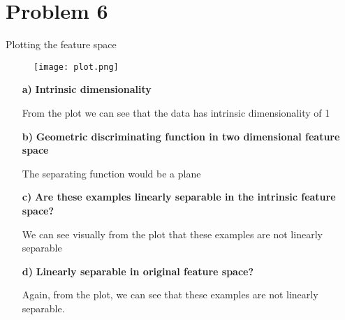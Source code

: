 \section{Problem 6}%

Plotting the feature space

\graphicspath{ {/home/computer/ucsc/master-2/quarter-1/machine-learning/assignment_01/figures/} }
\begin{figure}[H]
    \texttt{[image: plot.png]}
\end{figure}

\begin{itemize}
  \item[ \textbf{a)} ] \textbf{Intrinsic dimensionality} 
    \par From the plot we can see that the data has intrinsic dimensionality of
    1
  \item[ \textbf{b)} ] \textbf{Geometric discriminating function in two
    dimensional feature space} 
    \par The separating function would be a plane
  \item[ \textbf{c)}] \textbf{Are these  examples linearly separable in the
    intrinsic feature space?} 
    \par We can see visually from the plot that these examples are not linearly
    separable
  \item[ \textbf{d)} ] \textbf{Linearly separable in original feature space?}
    \par Again, from the plot, we can see that these examples are not linearly
    separable.
\end{itemize}

